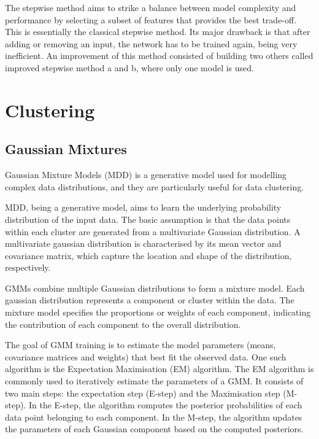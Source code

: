 \documentclass{report}
\begin{document}
The stepwise method aims to strike a balance between model complexity and performance by selecting a subset of features that provides the best trade-off. This is essentially the classical stepwise method. Its major drawback is that after adding or removing an input, the network has to be trained again, being very inefficient. An improvement of this method consisted of building two others called improved stepwise method a and b, where only one model is used.






\chapter{Clustering}

\section{Gaussian Mixtures}

Gaussian Mixture Models (MDD) is a generative model used for modelling complex data distributions, and they are particularly useful for data clustering. 

MDD, being a generative model, aims to learn the underlying probability distribution of the input data. The basic assumption is that the data points within each cluster are generated from a multivariate Gaussian distribution. A multivariate gaussian distribution is characterised by its mean vector and covariance matrix, which capture the location and shape of the distribution, respectively.

GMMs combine multiple Gaussian distributions to form a mixture model. Each gaussian distribution represents a component or cluster within the data. The mixture model specifies the proportions or weights of each component, indicating the contribution of each component to the overall distribution.

The goal of GMM training is to estimate the model parameters (means, covariance matrices and weights) that best fit the observed data. One such algorithm is the Expectation Maximisation (EM) algorithm. The EM algorithm is commonly used to iteratively estimate the parameters of a GMM. It consists of two main steps: the expectation step (E-step) and the Maximisation step (M-step). In the E-step, the algorithm computes the posterior probabilities of each data point belonging to each component. In the M-step, the algorithm updates the parameters of each Gaussian component based on the computed posteriors.
\end{document}
